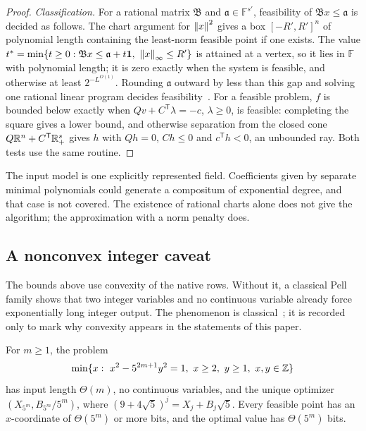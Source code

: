 \begin{proof}
\emph{Classification.} For a rational matrix $\mathfrak B$ and
$\mathfrak a\in\mathbb F^{s'}$, feasibility of $\mathfrak Bx\le\mathfrak a$ is
decided as follows. The chart argument for $\left\lVert x\right\rVert^2$ gives a box
$[-R',R']^{n}$ of polynomial length containing the least-norm feasible point
if one exists. The value $t^*=\min\{t\ge0:\mathfrak Bx\le\mathfrak a+t\mathbf1,
\ \left\lVert x\right\rVert_\infty\le R'\}$ is attained at a vertex, so it lies in $\mathbb F$
with polynomial length; it is zero exactly when the system is feasible, and
otherwise at least $2^{-L^{O(1)}}$. Rounding $\mathfrak a$ outward by less
than this gap and solving one rational linear program decides
feasibility~\cite{GroetschelLovaszSchrijver1988}. For a feasible problem,
$f$ is bounded below exactly when $Qv+C^{\mathsf T}\lambda=-c$, $\lambda\ge0$,
is feasible: completing the square gives a lower bound, and otherwise
separation from the closed cone $Q\mathbb R^n+C^{\mathsf T}\mathbb R^s_+$ gives $h$ with
$Qh=0$, $Ch\le0$ and $c^{\mathsf T}h<0$, an unbounded ray. Both tests use the
same routine.
\end{proof}

The input model is one explicitly represented field. Coefficients given by
separate minimal polynomials could generate a compositum of exponential
degree, and that case is not covered. The existence of rational charts alone
does not give the algorithm; the approximation with a norm penalty does.

\subsection{A nonconvex integer caveat}
\label{app:qc-pell}

The bounds above use convexity of the native rows. Without it, a classical
Pell family shows that two integer variables and no continuous variable
already force exponentially long integer output. The phenomenon is
classical~\cite{Lenstra2002}; it is recorded only to mark why convexity
appears in the statements of this paper.

\begin{proposition}
\label{prop:qc-pell}
For $m\ge1$, the problem
\[
\min\{x:\ x^2-5^{2m+1}y^2=1,\ x\ge2,\ y\ge1,\ x,y\in\Z\}
\]
has input length $\Theta(m)$, no continuous variables, and the unique
optimizer $(X_{5^m},B_{5^m}/5^m)$, where $(9+4\sqrt5)^j=X_j+B_j\sqrt5$. Every
feasible point has an $x$-coordinate of $\Theta(5^m)$ or more bits, and the
optimal value has $\Theta(5^m)$ bits.
\end{proposition}


